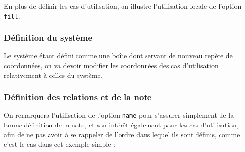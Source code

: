 \documentclass[a4paper,11pt]{report}
\newcommand{\inputTikZ}[1]{%
  }%
\newcommand{\inputTikZ}[1]{%
    \texttt{[image: fig/\#1.pdf]}%
  }%
\begin{document}
En plus de définir les cas d'utilisation, on illustre l'utilisation locale de l'option {\tt fill}.

{\color{red!70!black}
\vspace{-0.4cm}
}


\begin{center}
\inputTikZ{usecasediagstep2}
\end{center}

\subsubsection{Définition du système}

Le système étant défini comme une boîte dont servant de nouveau repère de coordonnées, on va devoir modifier les coordonnées des cas d'utilisation relativement à celles du système.

{\color{red!70!black}
\vspace{-0.4cm}
}
\vspace{-0.4cm}
{\color{red!70!black}
\vspace{-0.4cm}
}


\begin{center}
\inputTikZ{usecasediagstep3}
\end{center}

\subsubsection{Définition des relations et de la note}

On remarquera l'utilisation de l'option {\tt name} pour s'assurer simplement de la bonne définition de la note, et son intérêt également pour les cas d'utilisation, afin de ne pas avoir à se rappeler de l'ordre dans lequel ils sont définis, comme c'est le cas dans cet exemple simple :

\vspace{-0.4cm}
{\color{red!70!black}

}

\begin{center}
\inputTikZ{usecasediagstep4}
\end{center}
\end{document}
